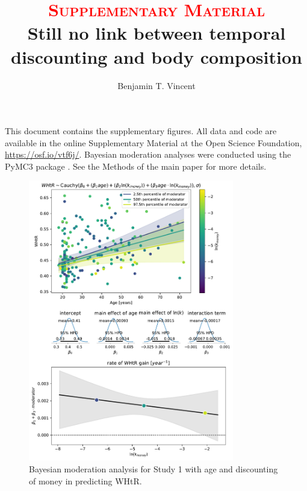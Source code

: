 \documentclass[12pt, a4paper]{article}
\title{{\normalsize \textsc{\textcolor{red}{Supplementary Material}}}\\ Still no link between temporal discounting and body composition}
\author{Benjamin T. Vincent}
\affil{School of Social Science, University of Dundee, Scotland, UK.}
\begin{document}
\maketitle

This document contains the supplementary figures. All data and code are available in the online Supplementary Material at the Open Science Foundation, \url{https://osf.io/vtf6j/}.
Bayesian moderation analyses were conducted using the PyMC3   package \citep{Salvatier:2016ki}. See the Methods of the main paper for more details.


\begin{figure} 
	\centering
	\includegraphics[width=0.8\textwidth]{analysis/study1 whtr~age*money.pdf} 
	\caption{Bayesian moderation analysis for Study 1 with age and discounting of money in predicting WHtR.}
	\label{fig:s1_whtr_money}
\end{figure}
\end{document}
